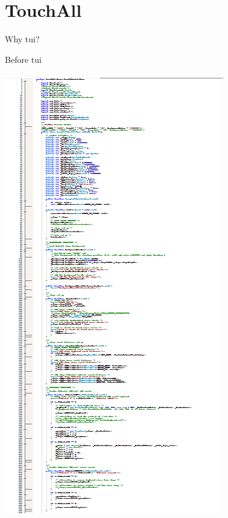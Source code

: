 \section{TouchAll}
\begin{frame}%
\begin{block}{Why tui?}
\begin{minipage}{1.0\linewidth}
\begin{center}
\begin{minipage}{.39\linewidth}
\begin{center}
Before tui\\$\;$\\
\includegraphics[scale=0.18]{images/old_part1.png}\\

\end{center}
\end{minipage}
\end{center}
\end{minipage}
\end{block}
\end{frame}
